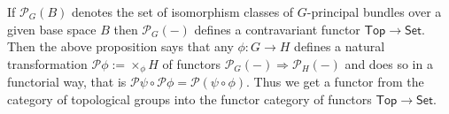 If $\mathcal{P}_G(B)$ denotes the set of isomorphism classes of $G$-principal bundles over a given base space $B$ then $\mathcal{P}_G(-)$ defines a contravariant functor $\mathsf{Top} \to \mathsf{Set}$. Then the above proposition says that any $\phi \colon G \to H$ defines a natural transformation $\mathcal{P}\phi := \times_\phi H$ of functors $\mathcal{P}_G(-) \Rightarrow \mathcal{P}_H(-)$ and does so in a functorial way, that is $\mathcal{P}\psi \circ \mathcal{P}\phi = \mathcal{P}(\psi \circ \phi)$. Thus we get a functor from the category of topological groups into the functor category of functors $\mathsf{Top} \to \mathsf{Set}$.
